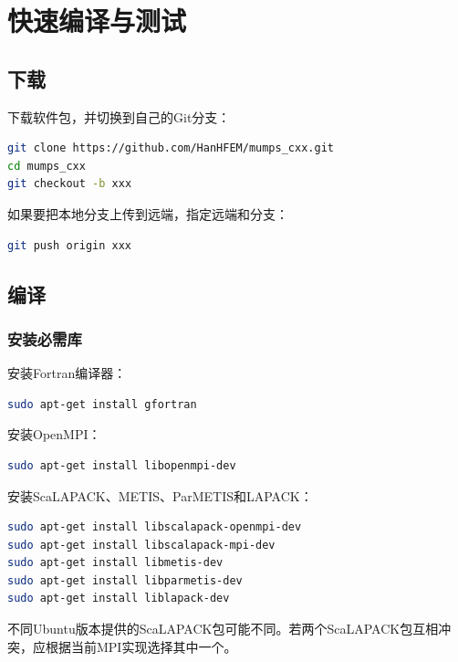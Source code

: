 \chapter{快速编译与测试}

\section{下载}

下载软件包，并切换到自己的Git分支：

\begin{lstlisting}[language=bash]
git clone https://github.com/HanHFEM/mumps_cxx.git
cd mumps_cxx
git checkout -b xxx
\end{lstlisting}

如果要把本地分支上传到远端，指定远端和分支：

\begin{lstlisting}[language=bash]
git push origin xxx
\end{lstlisting}

\section{编译}

\subsection{安装必需库}

安装Fortran编译器：

\begin{lstlisting}[language=bash]
sudo apt-get install gfortran
\end{lstlisting}

安装OpenMPI：

\begin{lstlisting}[language=bash]
sudo apt-get install libopenmpi-dev
\end{lstlisting}

安装ScaLAPACK、METIS、ParMETIS和LAPACK：

\begin{lstlisting}[language=bash]
sudo apt-get install libscalapack-openmpi-dev
sudo apt-get install libscalapack-mpi-dev
sudo apt-get install libmetis-dev
sudo apt-get install libparmetis-dev
sudo apt-get install liblapack-dev
\end{lstlisting}

不同Ubuntu版本提供的ScaLAPACK包可能不同。若两个ScaLAPACK包互相冲突，应根据当前MPI实现选择其中一个。


